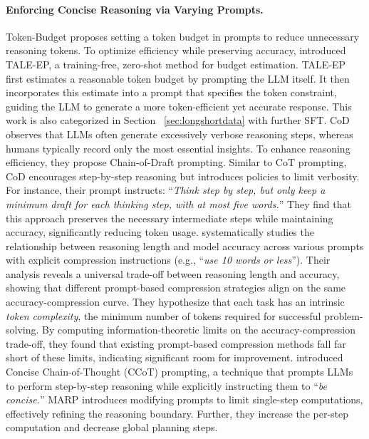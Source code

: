 \paragraph{Enforcing Concise Reasoning via Varying Prompts.}
%
Token-Budget\cite{han2024token} proposes setting a token budget in prompts to reduce unnecessary reasoning tokens. To optimize efficiency while preserving accuracy, \cite{han2024token} introduced TALE-EP, a training-free, zero-shot method for budget estimation. TALE-EP first estimates a reasonable token budget by prompting the LLM itself. It then incorporates this estimate into a prompt that specifies the token constraint, guiding the LLM to generate a more token-efficient yet accurate response. This work is also categorized in Section ~\ref{sec:longshortdata} with further SFT.
%
CoD \cite{xu2025chain} observes that LLMs often generate excessively verbose reasoning steps, whereas humans typically record only the most essential insights. To enhance reasoning efficiency, they propose Chain-of-Draft prompting. Similar to CoT prompting, CoD encourages step-by-step reasoning but introduces policies to limit verbosity. For instance, their prompt instructs: ``\textit{Think step by step, but only keep a minimum draft for each thinking step, with at most five words.}'' They find that this approach preserves the necessary intermediate steps while maintaining accuracy, significantly reducing token usage.
%
\cite{lee2025well} systematically studies the relationship between reasoning length and model accuracy across various prompts with explicit compression instructions (e.g., ``\textit{use 10 words or less}''). Their analysis reveals a universal trade-off between reasoning length and accuracy, showing that different prompt-based compression strategies align on the same accuracy-compression curve. They hypothesize that each task has an intrinsic \textit{token complexity}, the minimum number of tokens required for successful problem-solving. By computing information-theoretic limits on the accuracy-compression trade-off, they found that existing prompt-based compression methods fall far short of these limits, indicating significant room for improvement.
%
\cite{renze2024benefits} introduced Concise Chain-of-Thought (CCoT) prompting, a technique that prompts LLMs to perform step-by-step reasoning while explicitly instructing them to ``\textit{be concise.}'' 
%
MARP \cite{chen2024unlocking} introduces modifying prompts to limit single-step computations, effectively refining the reasoning boundary. Further, they increase the per-step computation and decrease global planning steps.

